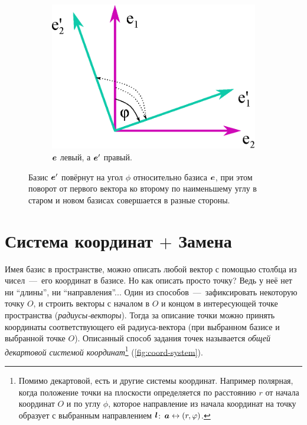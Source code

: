 \documentclass[a4paper,12pt]{article}
\begin{document}
\begin{figure}
\begin{subfigure}[b]{0.4\columnwidth}
      \includegraphics[width=\textwidth]{turned-ortonorm-basis2_left1}
      \caption{$\boldsymbol e$ левый, а $\boldsymbol e'$ правый.}
    \end{subfigure}  %
    
    \caption{Базис $\boldsymbol e'$ повёрнут на угол $\phi$ относительно базиса $\boldsymbol e$, при этом поворот от первого вектора ко второму по наименьшему углу в старом и новом базисах совершается в разные стороны.}
    \label{fig:turned-ortonorm-basis2}
  \end{figure}


  \section{Система координат $+$ Замена}
  
  Имея базис в пространстве, можно описать любой вектор с помощью столбца из чисел~---~его координат в базисе.
  Но как описать просто точку?
  Ведь у неё нет ни ``длины'', ни ``направления''...
  Один из способов~---~зафиксировать некоторую точку $O$, и строить векторы с началом в $O$ и концом в интересующей точке пространства (\emph{радиусы-векторы}).
  Тогда за описание точки можно принять координаты соответствующего ей радиуса-вектора (при выбранном базисе и выбранной точке $O$).
  Описанный способ задания точек называется \emph{общей декартовой системой координат}\footnote{Помимо декартовой, есть и другие системы координат. Например полярная, когда положение точки на плоскости определяется по расстоянию $r$ от начала координат $O$ и по углу $\phi$, которое направление из начала координат на точку образует с выбранным направлением $\boldsymbol l$: $\bds a \hm\leftrightarrow (r, \phi)$.} (\ref{fig:coord-system}).
  
\end{document}
